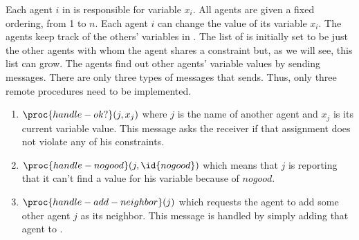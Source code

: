 Each agent $i$ in  is responsible for variable $x_i$.  All
agents are given a fixed  ordering, from 1 to $n$.  Each
agent $i$ can change the value of its variable $x_i$. The agents keep
track of the others' variables in . The list of
 is initially set to be just the other agents with whom
the agent shares a constraint but, as we will see, this list can grow.
The agents find out other agents' variable values by sending messages.
There are only three types of messages that  sends. Thus,
only three remote procedures need to be implemented.

\begin{enumerate}
\item $\proc{handle-ok?}(j, x_{j})$ where $j$ is the name of another agent
  and $x_j$ is its current variable value. This message asks the
  receiver if that assignment does not violate any of his constraints.

\item $\proc{handle-nogood}(j, \id{nogood})$ which means that $j$ is
  reporting that it can't find a value for his variable because of
  $nogood$.

\item $\proc{handle-add-neighbor}(j)$ which requests the agent to add
  some other agent $j$ as its neighbor. This message is handled by simply
  adding that agent to .
\end{enumerate}

